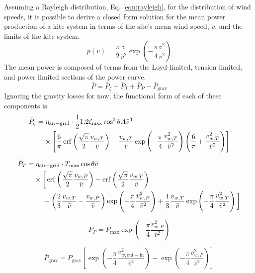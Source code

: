 \documentclass[11pt]{amsart}
\DeclareMathOperator\erf{erf}
\newcommand{\airgrid}{\mathrm{air-grid}}
\newcommand{\cutin}{\mathrm{cut-in}}
\newcommand{\grav}{\mathrm{grav}}
\newcommand{\wind}{w}
\begin{document}
Assuming a Rayleigh distribution, Eq. \ref{eqn:rayleigh}, for the
distribution of wind speeds, it is possible to derive a closed form
solution for the mean power production of a kite system in terms of
the site's mean wind speed, $\bar{v}$, and the limits of the kite
system.
%
\begin{equation}
\label{eqn:rayleigh}
p(v) = \frac{\pi}{2} \frac{v}{\bar{v}^2} \exp \left(-\frac{\pi}{4} \frac{v^2}{\bar{v}^2} \right)
\end{equation}
%
The mean power is composed of terms from the Loyd-limited, tension
limited, and power limited sections of the power curve.
\begin{equation}
\bar{P} = \bar{P}_{\zeta} + \bar{P}_T + \bar{P}_P - \bar{P}_{\grav}
\end{equation}
%
Ignoring the gravity losses for now, the functional form of each of
these components is:
%
\begin{align}
\bar{P}_{\zeta} =&\;
\eta_{\airgrid} \cdot \frac{1}{2} \rho \zeta_{\max} \cos^3 \theta A \bar{v}^3 \\ \notag
&\times \left[\frac{6}{\pi} \erf \left(\frac{\sqrt{\pi}}{2} \frac{v_{\wind,T}}{\bar{v}}\right) -
\frac{v_{\wind,T}}{\bar{v}} \exp \left(-\frac{\pi}{4}\frac{v_{\wind,T}^2}{\bar{v}^2}\right)
\left(\frac{6}{\pi} + \frac{v_{\wind,T}^2}{\bar{v}^2}\right)
\right]
\end{align}

\begin{align}
\bar{P}_T =&\; \eta_{\airgrid} \cdot T_{\max} \cos \theta \bar{v} \\ \notag
           & \times \bigg[
\erf \left(\frac{\sqrt{\pi}}{2} \frac{v_{\wind,P}}{\bar{v}}\right) -
\erf \left(\frac{\sqrt{\pi}}{2} \frac{v_{\wind,T}}{\bar{v}}\right) \\ \notag
%
& \phantom{\times \bigg[} + \left(\frac{2}{3} \frac{v_{\wind,T}}{\bar{v}} -
\frac{v_{\wind,P}}{\bar{v}}\right)
\exp \left( -\frac{\pi}{4} \frac{v_{\wind,P}^2}{\bar{v}^2} \right) +
\frac{1}{3} \frac{v_{\wind,T}}{\bar{v}}
\exp \left( -\frac{\pi}{4} \frac{v_{\wind,T}^2}{\bar{v}^2} \right) \bigg]
\end{align}

\begin{equation}
\bar{P}_P = P_{\max} \exp \left( -\frac{\pi}{4} \frac{v_{\wind,P}^2}{\bar{v}^2}\right)
\end{equation}

\begin{equation}
  \bar{P}_{\grav} = P_{\grav} \left[
    \exp \left(-\frac{\pi}{4} \frac{v_{\wind,\cutin}^2}{\bar{v}^2} \right) -
    \exp \left(-\frac{\pi}{4} \frac{v_{\wind,P}^2}{\bar{v}^2} \right)
    \right]
\end{equation}
\end{document}
